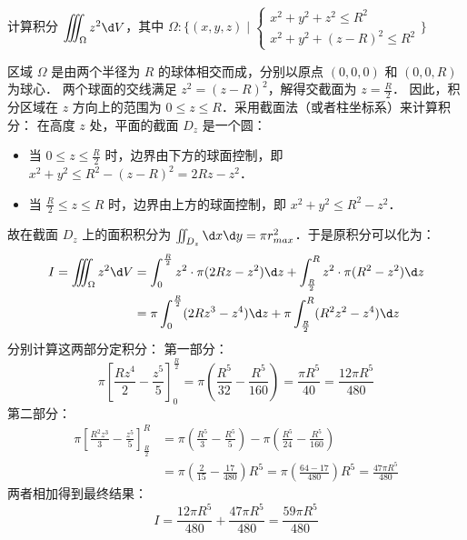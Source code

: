 \documentclass[12pt, a4paper, oneside, UTF8]{ctexbook}
\begin{document}
\begin{exercise}
    计算积分 $\displaystyle\iiint_\Omega z^2 \d V$，其中 $\Omega :\{(x,y,z)\mid \begin{cases}
    x^2+y^2+z^2\le R^2\\
    x^2+y^2+(z-R)^2\le R^2
    \end{cases}\}$ 
\end{exercise}
\begin{solution}
区域 $\Omega$ 是由两个半径为 $R$ 的球体相交而成，分别以原点 $(0,0,0)$ 和 $(0,0,R)$ 为球心．
两个球面的交线满足 $z^2 = (z-R)^2$，解得交截面为 $z = \frac{R}{2}$．
因此，积分区域在 $z$ 方向上的范围为 $0 \le z \le R$．采用截面法（或者柱坐标系）来计算积分：
在高度 $z$ 处，平面的截面 $D_z$ 是一个圆：
\begin{itemize}
    \item 当 $0 \le z \le \frac{R}{2}$ 时，边界由下方的球面控制，即 $x^2+y^2 \le R^2 - (z-R)^2 = 2Rz - z^2$．
    \item 当 $\frac{R}{2} \le z \le R$ 时，边界由上方的球面控制，即 $x^2+y^2 \le R^2 - z^2$．
\end{itemize}
故在截面 $D_z$ 上的面积积分为 $\iint_{D_z} \d x\d y = \pi r_{max}^2$．于是原积分可以化为：
\begin{align*}
I = \iiint_\Omega z^2 \d V &= \int_0^{\frac{R}{2}} z^2 \cdot \pi(2Rz - z^2) \d z + \int_{\frac{R}{2}}^R z^2 \cdot \pi(R^2 - z^2) \d z \\
  &= \pi \int_0^{\frac{R}{2}} (2Rz^3 - z^4) \d z + \pi \int_{\frac{R}{2}}^R (R^2z^2 - z^4) \d z
\end{align*}
分别计算这两部分定积分：
第一部分：
\[ \pi \left[ \frac{Rz^4}{2} - \frac{z^5}{5} \right]_0^{\frac{R}{2}} = \pi \left( \frac{R^5}{32} - \frac{R^5}{160} \right) = \frac{\pi R^5}{40} = \frac{12\pi R^5}{480} \]
第二部分：
\begin{align*}
\pi \left[ \frac{R^2z^3}{3} - \frac{z^5}{5} \right]_{\frac{R}{2}}^R &= \pi \left( \frac{R^5}{3} - \frac{R^5}{5} \right) - \pi \left( \frac{R^5}{24} - \frac{R^5}{160} \right) \\
&= \pi \left( \frac{2}{15} - \frac{17}{480} \right) R^5 = \pi \left( \frac{64 - 17}{480} \right) R^5 = \frac{47\pi R^5}{480} 
\end{align*}
两者相加得到最终结果：
\[ I = \frac{12\pi R^5}{480} + \frac{47\pi R^5}{480} = \boxed{\frac{59\pi R^5}{480}} \]
\end{solution}
\end{document}
